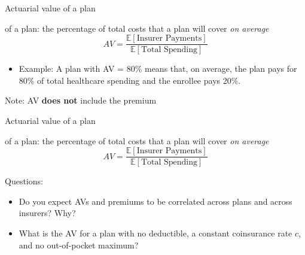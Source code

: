 





\begin{frame}{Actuarial value of a plan}

     of a plan: the percentage of total costs that a plan will cover \textit{on average}
    \begin{equation*}
        AV = \frac{\mathbb{E}[\text{Insurer Payments}]}{\mathbb{E}[\text{Total Spending}]}
    \end{equation*}
    \begin{itemize}
        \item Example: A plan with AV = 80\% means that, on average, the plan pays for 80\% of total healthcare spending and the enrollee pays 20\%.
    \end{itemize}
    \vspace{5mm}
    Note: AV \textbf{does not} include the premium
    
\end{frame}
\begin{frame}{Actuarial value of a plan}

     of a plan: the percentage of total costs that a plan will cover \textit{on average}
    \begin{equation*}
        AV = \frac{\mathbb{E}[\text{Insurer Payments}]}{\mathbb{E}[\text{Total Spending}]}
    \end{equation*}

    Questions:
    \begin{itemize}
        \item {\color{gray} Do you expect AVs and premiums to be correlated across plans and across insurers? Why?}
        \item {\color{gray} What is the AV for a plan with no deductible, a constant coinsurance rate $c$, and no out-of-pocket maximum?}
    \end{itemize}
    
\end{frame}
